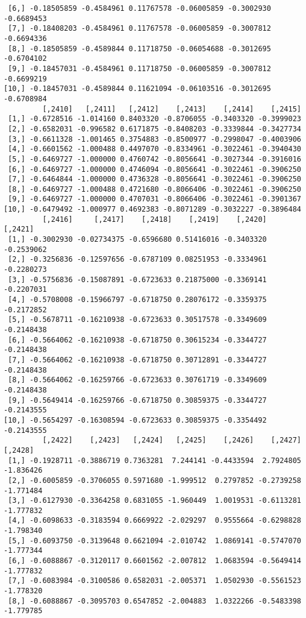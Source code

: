 \documentclass[
  letterpaper,
  DIV=11,
  numbers=noendperiod]{scrreprt}
\begin{document}
\begin{verbatim}
 [6,] -0.18505859 -0.4584961 0.11767578 -0.06005859 -0.3002930 -0.6689453
 [7,] -0.18408203 -0.4584961 0.11767578 -0.06005859 -0.3007812 -0.6694336
 [8,] -0.18505859 -0.4589844 0.11718750 -0.06054688 -0.3012695 -0.6704102
 [9,] -0.18457031 -0.4584961 0.11718750 -0.06005859 -0.3007812 -0.6699219
[10,] -0.18457031 -0.4589844 0.11621094 -0.06103516 -0.3012695 -0.6708984
         [,2410]   [,2411]   [,2412]    [,2413]    [,2414]    [,2415]
 [1,] -0.6728516 -1.014160 0.8403320 -0.8706055 -0.3403320 -0.3999023
 [2,] -0.6582031 -0.996582 0.6171875 -0.8408203 -0.3339844 -0.3427734
 [3,] -0.6611328 -1.001465 0.3754883 -0.8500977 -0.2998047 -0.4003906
 [4,] -0.6601562 -1.000488 0.4497070 -0.8334961 -0.3022461 -0.3940430
 [5,] -0.6469727 -1.000000 0.4760742 -0.8056641 -0.3027344 -0.3916016
 [6,] -0.6469727 -1.000000 0.4746094 -0.8056641 -0.3022461 -0.3906250
 [7,] -0.6464844 -1.000000 0.4736328 -0.8056641 -0.3022461 -0.3906250
 [8,] -0.6469727 -1.000488 0.4721680 -0.8066406 -0.3022461 -0.3906250
 [9,] -0.6469727 -1.000000 0.4707031 -0.8066406 -0.3022461 -0.3901367
[10,] -0.6479492 -1.000977 0.4692383 -0.8071289 -0.3032227 -0.3896484
         [,2416]     [,2417]    [,2418]    [,2419]    [,2420]    [,2421]
 [1,] -0.3002930 -0.02734375 -0.6596680 0.51416016 -0.3403320 -0.2539062
 [2,] -0.3256836 -0.12597656 -0.6787109 0.08251953 -0.3334961 -0.2280273
 [3,] -0.5756836 -0.15087891 -0.6723633 0.21875000 -0.3369141 -0.2207031
 [4,] -0.5708008 -0.15966797 -0.6718750 0.28076172 -0.3359375 -0.2172852
 [5,] -0.5678711 -0.16210938 -0.6723633 0.30517578 -0.3349609 -0.2148438
 [6,] -0.5664062 -0.16210938 -0.6718750 0.30615234 -0.3344727 -0.2148438
 [7,] -0.5664062 -0.16210938 -0.6718750 0.30712891 -0.3344727 -0.2148438
 [8,] -0.5664062 -0.16259766 -0.6723633 0.30761719 -0.3349609 -0.2148438
 [9,] -0.5649414 -0.16259766 -0.6718750 0.30859375 -0.3344727 -0.2143555
[10,] -0.5654297 -0.16308594 -0.6723633 0.30859375 -0.3354492 -0.2143555
         [,2422]    [,2423]   [,2424]   [,2425]    [,2426]    [,2427]   [,2428]
 [1,] -0.1928711 -0.3886719 0.7363281  7.244141 -0.4433594  2.7924805 -1.836426
 [2,] -0.6005859 -0.3706055 0.5971680 -1.999512  0.2797852 -0.2739258 -1.771484
 [3,] -0.6127930 -0.3364258 0.6831055 -1.960449  1.0019531 -0.6113281 -1.777832
 [4,] -0.6098633 -0.3183594 0.6669922 -2.029297  0.9555664 -0.6298828 -1.798340
 [5,] -0.6093750 -0.3139648 0.6621094 -2.010742  1.0869141 -0.5747070 -1.777344
 [6,] -0.6088867 -0.3120117 0.6601562 -2.007812  1.0683594 -0.5649414 -1.777832
 [7,] -0.6083984 -0.3100586 0.6582031 -2.005371  1.0502930 -0.5561523 -1.778320
 [8,] -0.6088867 -0.3095703 0.6547852 -2.004883  1.0322266 -0.5483398 -1.779785

\end{verbatim}
\end{document}
